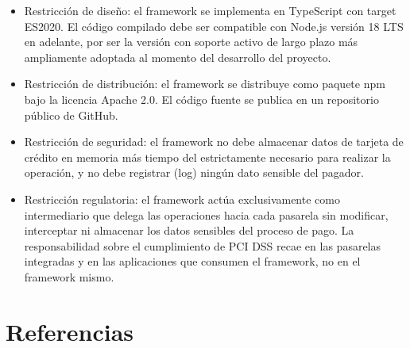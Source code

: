 \documentclass[10pt]{article}
\begin{document}
\begin{itemize}
  \item Restricción de diseño: el framework se implementa en TypeScript con target ES2020. El código compilado debe ser compatible con Node.js versión 18 LTS en adelante, por ser la versión con soporte activo de largo plazo más ampliamente adoptada al momento del desarrollo del proyecto.
  \item Restricción de distribución: el framework se distribuye como paquete npm bajo la licencia Apache 2.0. El código fuente se publica en un repositorio público de GitHub.
  \item Restricción de seguridad: el framework no debe almacenar datos de tarjeta de crédito en memoria más tiempo del estrictamente necesario para realizar la operación, y no debe registrar (log) ningún dato sensible del pagador.
  \item Restricción regulatoria: el framework actúa exclusivamente como intermediario que delega las operaciones hacia cada pasarela sin modificar, interceptar ni almacenar los datos sensibles del proceso de pago. La responsabilidad sobre el cumplimiento de PCI DSS recae en las pasarelas integradas y en las aplicaciones que consumen el framework, no en el framework mismo.
\end{itemize}



\section{Referencias}
\end{document}
